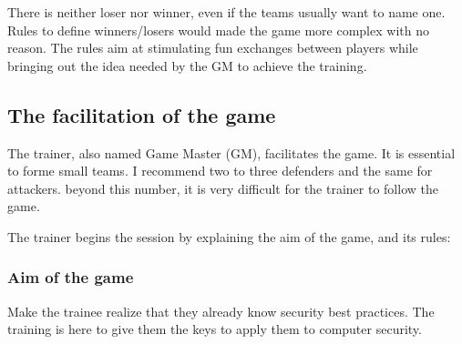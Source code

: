 \documentclass[11pt]{article} %
\begin{document}
There is neither loser nor winner, even if the teams usually want to name one. 
Rules to define winners/losers would made the game more complex with no reason. 
The rules aim at stimulating fun exchanges between players while bringing out the idea
needed by the GM to achieve the training.

%
%

\subsection{The facilitation of the game}
The trainer, also named Game Master (GM), facilitates the game.
It is essential to forme small teams. I recommend two to 
three defenders and the same for attackers. beyond this number, it is very 
difficult for the trainer to follow the game. 

The trainer begins the session by explaining the aim of the game, and its rules: \\

\subsubsection{Aim of the game}

Make the trainee realize that they already know security best practices.
The training is here to give them the keys to apply them to computer 
security.

\end{document}
